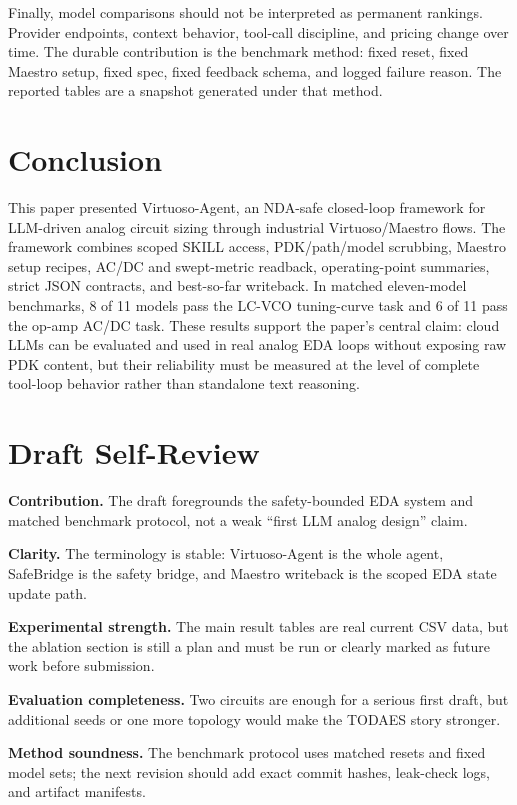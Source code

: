 \documentclass[acmsmall,review,anonymous]{acmart}
\newcommand{\framework}{Virtuoso-Agent}
\newcommand{\bridge}{SafeBridge}
\begin{document}
Finally, model comparisons should not be interpreted as permanent rankings.
Provider endpoints, context behavior, tool-call discipline, and pricing change
over time. The durable contribution is the benchmark method: fixed reset,
fixed Maestro setup, fixed spec, fixed feedback schema, and logged failure
reason. The reported tables are a snapshot generated under that method.

\section{Conclusion}
\label{sec:conclusion}

This paper presented \framework, an NDA-safe closed-loop framework for
LLM-driven analog circuit sizing through industrial Virtuoso/Maestro flows. The
framework combines scoped SKILL access, PDK/path/model scrubbing, Maestro
setup recipes, AC/DC and swept-metric readback, operating-point summaries,
strict JSON contracts, and best-so-far writeback. In matched eleven-model
benchmarks, 8 of 11 models pass the LC-VCO tuning-curve task and 6 of 11 pass
the op-amp AC/DC task. These results support the paper's central claim: cloud
LLMs can be evaluated and used in real analog EDA loops without exposing raw
PDK content, but their reliability must be measured at the level of complete
tool-loop behavior rather than standalone text reasoning.

\section*{Draft Self-Review}

\textbf{Contribution.} The draft foregrounds the safety-bounded EDA system and
matched benchmark protocol, not a weak ``first LLM analog design'' claim.

\textbf{Clarity.} The terminology is stable: \framework{} is the whole agent,
\bridge{} is the safety bridge, and Maestro writeback is the scoped EDA state
update path.

\textbf{Experimental strength.} The main result tables are real current CSV
data, but the ablation section is still a plan and must be run or clearly
marked as future work before submission.

\textbf{Evaluation completeness.} Two circuits are enough for a serious first
draft, but additional seeds or one more topology would make the TODAES story
stronger.

\textbf{Method soundness.} The benchmark protocol uses matched resets and fixed
model sets; the next revision should add exact commit hashes, leak-check logs,
and artifact manifests.



\end{document}
